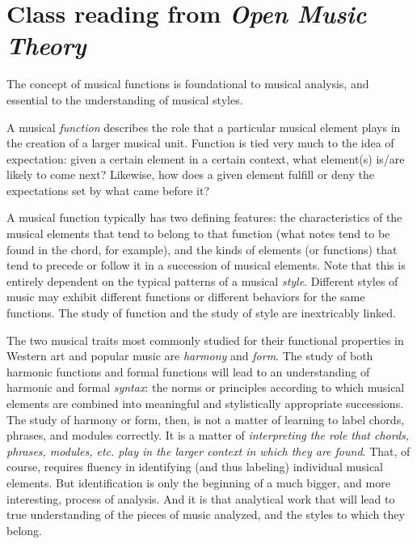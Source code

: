 \documentclass{book}
\begin{document}
\hypertarget{class-reading-from-open-music-theory-1}{%
\section{\texorpdfstring{Class reading from \emph{Open Music
Theory}}{Class reading from Open Music Theory}}\label{class-reading-from-open-music-theory-1}}

The concept of musical functions is foundational to musical analysis, and
essential to the understanding of musical styles.

A musical \emph{function} describes the role that a particular musical element
plays in the creation of a larger musical unit. Function is tied very much to
the idea of expectation: given a certain element in a certain context, what
element(s) is/are likely to come next? Likewise, how does a given element
fulfill or deny the expectations set by what came before it?

A musical function typically has two defining features: the characteristics of
the musical elements that tend to belong to that function (what notes tend to
be found in the chord, for example), and the kinds of elements (or functions)
that tend to precede or follow it in a succession of musical elements. Note
that this is entirely dependent on the typical patterns of a musical
\emph{style}. Different styles of music may exhibit different functions or
different behaviors for the same functions. The study of function and the
study of style are inextricably linked.

The two musical traits most commonly studied for their functional properties
in Western art and popular music are \emph{harmony} and \emph{form}. The study
of both harmonic functions and formal functions will lead to an understanding
of harmonic and formal \emph{syntax}: the norms or principles according to
which musical elements are combined into meaningful and stylistically
appropriate successions. The study of harmony or form, then, is not a matter
of learning to label chords, phrases, and modules correctly. It is a matter of
\emph{interpreting the role that chords, phrases, modules, etc. play in the
larger context in which they are found}. That, of course, requires fluency in
identifying (and thus labeling) individual musical elements. But
identification is only the beginning of a much bigger, and more interesting,
process of analysis. And it is that analytical work that will lead to true
understanding of the pieces of music analyzed, and the styles to which they
belong.
\end{document}
